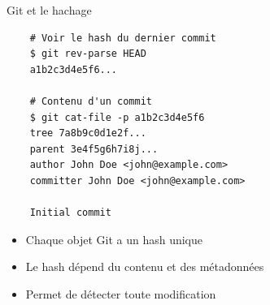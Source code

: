 \begin{frame}[fragile]{Git et le hachage}
  \begin{verbatim}
    # Voir le hash du dernier commit
    $ git rev-parse HEAD
    a1b2c3d4e5f6...

    # Contenu d'un commit
    $ git cat-file -p a1b2c3d4e5f6
    tree 7a8b9c0d1e2f...
    parent 3e4f5g6h7i8j...
    author John Doe <john@example.com>
    committer John Doe <john@example.com>

    Initial commit
  \end{verbatim}

  \begin{itemize}
    \item Chaque objet Git a un hash unique
    \item Le hash dépend du contenu et des métadonnées
    \item Permet de détecter toute modification
  \end{itemize}
\end{frame}